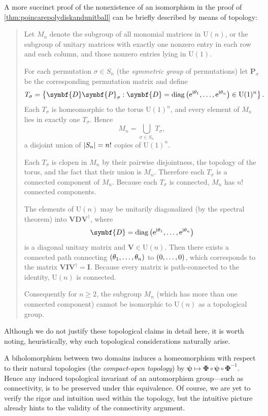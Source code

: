 \begin{remark}
    A more succinct proof of the nonexistence of an isomorphism in the proof of \cref{thm:poincarepolydiskandunitball} can be briefly described by means of topology:

    \begin{quote}
        Let \(M_n\) denote the subgroup of all monomial matrices in \(\mathrm{U}(n)\), or the subgroup of unitary matrices with exactly one nonzero entry in each row and each column, and those nonzero entries lying in \(\mathrm{U}(1)\).

        For each permutation \(\sigma\in S_n\) (the \textit{symmetric group} of permutations) let \(\symbf{P}_\sigma\) be the corresponding permutation matrix and define
        \[T_\sigma=\cbraces{\symbf{D}\symbf{P}_\sigma}{\symbf{D}=\operatorname{diag}\qty(\ee^{\ii\theta_1},\dots,\ee^{\ii\theta_n})\in\mathrm{U}(1)^n}.\]
        Each \(T_\sigma\) is homeomorphic to the torus \(\mathrm{U}(1)^n\), and every element of \(M_n\) lies in exactly one \(T_\sigma\). Hence
        \[M_n=\bigcup_{\sigma\in S_n} T_\sigma,\]
        a disjoint union of \(\abs{S_n}=n!\) copies of \(\mathrm{U}(1)^n\).

        Each \(T_\sigma\) is clopen in \(M_n\) by their pairwise disjointness, the topology of the torus, and the fact that their union is \(M_n\). Therefore each \(T_\sigma\) is a connected component of \(M_n\). Because each \(T_\sigma\) is connected, \(M_n\) has \(n!\) connected components.

        The elements of \(\mathrm{U}(n)\) may be unitarily diagonalized (by the spectral theorem) into \(\symbf{VD}\symbf{V}^\dagger\), where \[\symbf{D}=\operatorname{diag}\qty(\ee^{\ii\theta_1},\ldots,\ee^{\ii\theta_n})\] is a diagonal unitary matrix and \(\symbf{V}\in\mathrm{U}(n)\). Then there exists a connected path connecting \(\qty(\theta_1,\dots,\theta_n)\) to \(\qty(0,\ldots,0)\), which corresponds to the matrix \(\symbf{VI}\symbf{V}^\dagger=\symbf{I}\). Because every matrix is path-connected to the identity, \(\mathrm{U}(n)\) is connected.

        Consequently for \(n\ge2\), the subgroup \(M_n\) (which has more than one connected component) cannot be isomorphic to \(\mathrm{U}(n)\) as a topological group.
    \end{quote}
    Although we do not justify these topological claims in detail here, it is worth noting, heuristically, why such topological considerations naturally arise.

    A biholomorphism between two domains induces a homeomorphism with respect to their natural topologies (the \textit{compact-open topology}) by \(\symbf{\psi}\mapsto\symbf{\Phi}\circ\symbf{\psi}\circ\symbf{\Phi}^{-1}\). Hence any induced topological invariant of an automorphism group---such as connectivity, is to be preserved under this equivalence. Of course, we are yet to verify the rigor and intuition used within the topology, but the intuitive picture already hints to the validity of the connectivity argument.
\end{remark}
